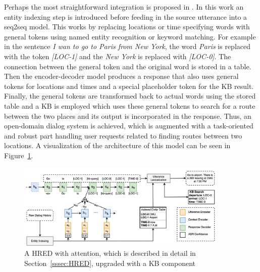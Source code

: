 \documentclass[12pt]{article}
\begin{document}
Perhaps the most straightforward integration is proposed in \cite{Zhao:2017}. In this work an entity indexing step is introduced before feeding in the source utterance into a seq2seq model. This works by replacing locations or time specifying words with general tokens using named entity recognition or keyword matching. For example in the sentence \textit{I wan to go to Paris from New York}, the word \textit{Paris} is replaced with the token \textit{[LOC-1]} and the \textit{New York} is replaced with \textit{[LOC-0]}. The connection between the general token and the original word is stored in a table.  Then the encoder-decoder model produces a response that also uses general tokens for locations and times and a special placeholder token for the KB result. Finally, the general tokens are transformed back to actual words using the stored table and a KB is employed which uses these general tokens to search for a route between the two places and its output is incorporated in the response. Thus, an open-domain dialog system is achieved, which is augmented with a task-oriented and robust part handling user requests related to finding routes between two locations. A visualization of the architecture of this model can be seen in Figure~\ref{fig:KB}.

\begin{figure}[H]
	\centering
	\includegraphics[width=0.9\textwidth]{pics/KB.png}
	\caption{A HRED with attention, which is described in detail in Section~\ref{sssec:HRED}, upgraded with a KB component \cite{Zhao:2017}}
	\label{fig:KB}
\end{figure}
\end{document}

